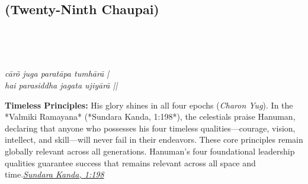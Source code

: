 
\newpage

\subsection*{ (Twenty-Ninth Chaupai)}

\begin{minipage}[t]{0.55\textwidth}
\vspace{0pt}

{\large \linespread{1.5}\selectfont
{}\\
\par}

\vspace{0.5em}

{\large \linespread{1.5}\selectfont
{}\\
\par}

\vspace{0.5em}

{\large \linespread{1.3}\selectfont
\textit{cārõ juga paratāpa tumhārā |}\\
\textit{hai parasiddha jagata ujiyārā ||}
\par}
\end{minipage}%
\hfill
\begin{minipage}[t]{0.42\textwidth}
\vspace{0pt}
\begin{tcolorbox}[anchorbox]
\textbf{Timeless Principles:} His glory shines in all four epochs (\textit{Charon Yug}). In the *Valmiki Ramayana* (*Sundara Kanda, 1:198*), the celestials praise Hanuman, declaring that anyone who possesses his four timeless qualities—courage, vision, intellect, and skill—will never fail in their endeavors. These core principles remain globally relevant across all generations.
\vspace{0.5em}\newline Hanuman's four foundational leadership qualities guarantee success that remains relevant across all space and time.\newline\null\hfill\href{https://www.valmiki.iitk.ac.in/sloka?field_kanda_tid=5&language=dv&field_sarga_value=1}{\textit{Sundara Kanda, 1:198}}
\end{tcolorbox}
\end{minipage}

